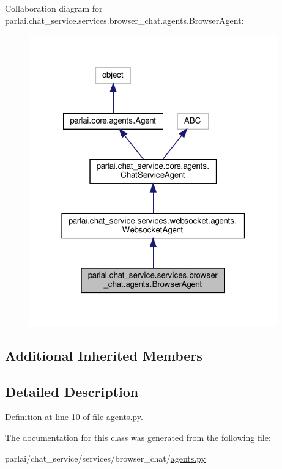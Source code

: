 Collaboration diagram for parlai.\+chat\+\_\+service.\+services.\+browser\+\_\+chat.\+agents.\+Browser\+Agent\+:
\nopagebreak
\begin{figure}[H]
\begin{center}
\leavevmode
\includegraphics[width=304pt]{d3/d8e/classparlai_1_1chat__service_1_1services_1_1browser__chat_1_1agents_1_1BrowserAgent__coll__graph}
\end{center}
\end{figure}
\subsection*{Additional Inherited Members}


\subsection{Detailed Description}


Definition at line 10 of file agents.\+py.



The documentation for this class was generated from the following file\+:\begin{DoxyCompactItemize}
\item 
parlai/chat\+\_\+service/services/browser\+\_\+chat/\hyperlink{parlai_2chat__service_2services_2browser__chat_2agents_8py}{agents.\+py}\end{DoxyCompactItemize}
